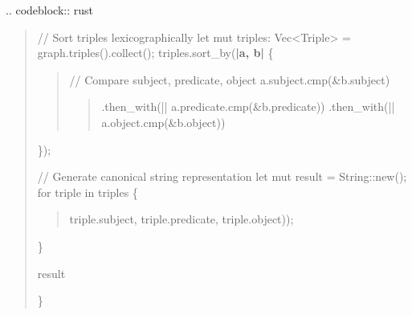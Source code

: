 \documentclass[letterpaper,10pt,english]{sphinxmanual}
\begin{document}
\sphinxAtStartPar
{}
.. code\sphinxhyphen{}block:: rust
\begin{quote}
\begin{description}
\sphinxAtStartPar
// Sort triples lexicographically
let mut triples: Vec\textless{}Triple\textgreater{} = graph.triples().collect();
triples.sort\_by({\color{red}\bfseries{}|a, b|} \{
\begin{quote}

\sphinxAtStartPar
// Compare subject, predicate, object
a.subject.cmp(\&b.subject)
\begin{quote}

\sphinxAtStartPar
.then\_with(|| a.predicate.cmp(\&b.predicate))
.then\_with(|| a.object.cmp(\&b.object))
\end{quote}
\end{quote}

\sphinxAtStartPar
\});

\sphinxAtStartPar
// Generate canonical string representation
let mut result = String::new();
for triple in triples \{
\begin{quote}
\begin{description}
\sphinxAtStartPar
triple.subject, triple.predicate, triple.object));

\end{description}
\end{quote}

\sphinxAtStartPar
\}

\sphinxAtStartPar
result

\end{description}

\sphinxAtStartPar
\}
\end{quote}
\end{document}
